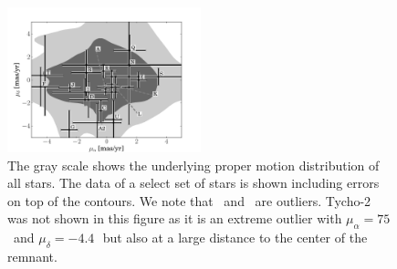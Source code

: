\begin{figure}[htbp] %
   \centering
   \includegraphics[width=0.5\textwidth]{chapter3/plots/propmot_distr.pdf} 
   \caption{The gray scale shows the underlying proper motion distribution of all stars. The data of a select set of stars is shown including errors on top of the contours. We note that \starg\ and \staraii\ are outliers. Tycho-2 was not shown in this figure as it is an extreme outlier with $\mu_\alpha=75$\,\masyr\ and $\mu_\delta=-4.4$\,\masyr\ but also at a large distance to the center of the remnant.}
   \label{fig:propmot}
\end{figure}


